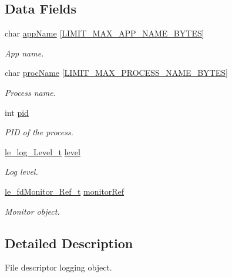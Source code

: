 \subsection*{Data Fields}
\begin{DoxyCompactItemize}
\item 
char \hyperlink{struct_fd_log__t_a0fb4fb5c558f6e56e211f72d57bcf7a3}{app\+Name} \mbox{[}\hyperlink{limit_8h_a3be1f83793d35365d5f9e765e0ffc619}{L\+I\+M\+I\+T\+\_\+\+M\+A\+X\+\_\+\+A\+P\+P\+\_\+\+N\+A\+M\+E\+\_\+\+B\+Y\+T\+ES}\mbox{]}
\begin{DoxyCompactList}\small\item\em App name. \end{DoxyCompactList}\item 
char \hyperlink{struct_fd_log__t_aeac1eaa017ca8575460fc0d8172ba386}{proc\+Name} \mbox{[}\hyperlink{limit_8h_aa34277e61725bc1003ab172a078531cf}{L\+I\+M\+I\+T\+\_\+\+M\+A\+X\+\_\+\+P\+R\+O\+C\+E\+S\+S\+\_\+\+N\+A\+M\+E\+\_\+\+B\+Y\+T\+ES}\mbox{]}
\begin{DoxyCompactList}\small\item\em Process name. \end{DoxyCompactList}\item 
int \hyperlink{struct_fd_log__t_ab8ab190f1dea284f27dca4b9976fbf21}{pid}
\begin{DoxyCompactList}\small\item\em P\+ID of the process. \end{DoxyCompactList}\item 
\hyperlink{le__log_8h_aa3de78c088c398afb23c0b582deabc0a}{le\+\_\+log\+\_\+\+Level\+\_\+t} \hyperlink{struct_fd_log__t_a47ae3d2c090271a58648ca9a4929f5f1}{level}
\begin{DoxyCompactList}\small\item\em Log level. \end{DoxyCompactList}\item 
\hyperlink{le__fd_monitor_8h_a85048556f0b95147af81e76907895d42}{le\+\_\+fd\+Monitor\+\_\+\+Ref\+\_\+t} \hyperlink{struct_fd_log__t_ad5a05e11ca8de3c19f5ff7dc6b59f33f}{monitor\+Ref}
\begin{DoxyCompactList}\small\item\em Monitor object. \end{DoxyCompactList}\end{DoxyCompactItemize}


\subsection{Detailed Description}
File descriptor logging object.

